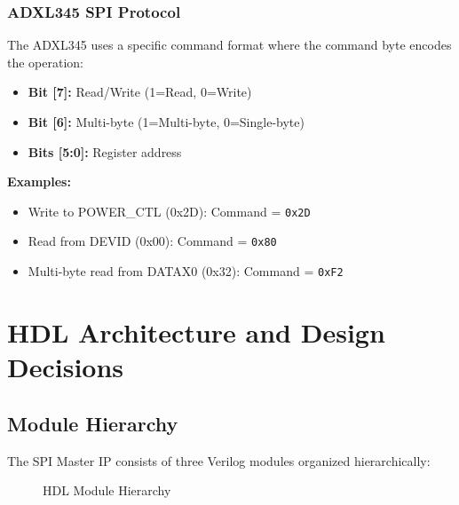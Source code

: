 \documentclass[11pt,a4paper]{article}
\begin{document}
\subsubsection{ADXL345 SPI Protocol}

The ADXL345 uses a specific command format where the command byte encodes the operation:

\begin{itemize}
    \item \textbf{Bit [7]:} Read/Write (1=Read, 0=Write)
    \item \textbf{Bit [6]:} Multi-byte (1=Multi-byte, 0=Single-byte)
    \item \textbf{Bits [5:0]:} Register address
\end{itemize}

\textbf{Examples:}
\begin{itemize}
    \item Write to POWER\_CTL (0x2D): Command = \texttt{0x2D}
    \item Read from DEVID (0x00): Command = \texttt{0x80}
    \item Multi-byte read from DATAX0 (0x32): Command = \texttt{0xF2}
\end{itemize}

\section{HDL Architecture and Design Decisions}

\subsection{Module Hierarchy}

The SPI Master IP consists of three Verilog modules organized hierarchically:

\begin{figure}[H]
\centering
{}
\caption{HDL Module Hierarchy}
\end{figure}
\end{document}
